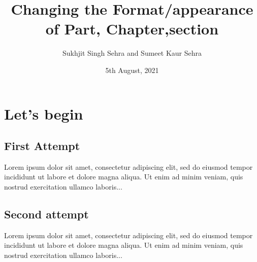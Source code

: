 \documentclass[a4paper,12pt]{report}
\title{Changing the Format/appearance of Part, Chapter,section }
\author{Sukhjit Singh Sehra and Sumeet Kaur Sehra}
\date{5th August, 2021}
\begin{document}
\maketitle
 
\chapter{Let's begin}
 
\section{First Attempt}
 
Lorem ipsum dolor sit amet, consectetur adipiscing elit, sed do 
eiusmod tempor incididunt ut labore et dolore magna aliqua. Ut 
enim ad minim veniam, quis nostrud exercitation ullamco laboris...
 
\section{Second attempt}
 
Lorem ipsum dolor sit amet, consectetur adipiscing elit, sed do 
eiusmod tempor incididunt ut labore et dolore magna aliqua. Ut 
enim ad minim veniam, quis nostrud exercitation ullamco laboris...
 
\end{document}
